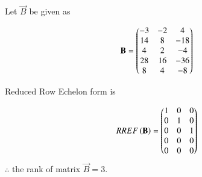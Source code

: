 	
	Let $\vec{B}$ be given as
	
	\begin{align} \label{eq:solutions/2017/dec/72/eq3}
		\mathbf{B} = \begin{pmatrix}-3&-2&4 \\ 14&8&-18 \\ 4&2&-4 \\ 28&16&-36 \\ 8&4&-8\end{pmatrix}
	\end{align}
	
	Reduced Row Echelon form is
	
	\begin{align}
		RREF\left(\mathbf{B}\right) = \begin{pmatrix}1&0&0 \\ 0&1&0 \\ 0&0&1 \\ 0&0&0 \\ 0&0&0\end{pmatrix}
	\end{align}
	$\therefore$ the rank of matrix $\vec{B} = 3$.
	
